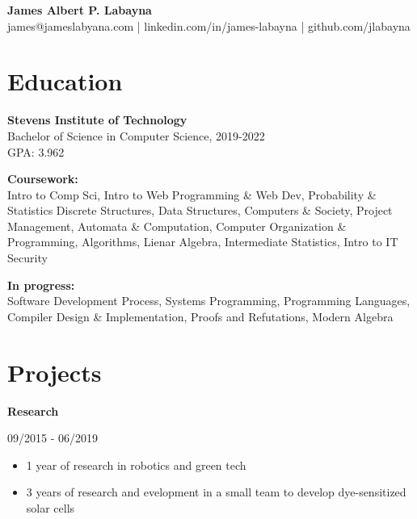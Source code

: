 \documentclass[11pt,letterpaper]{article}
\begin{document}
  \begin{center}
    \textbf{James Albert P. Labayna} \\
    \small james@jameslabyana.com | linkedin.com/in/james-labayna | github.com/jlabayna
  \end{center}
  
  \iffalse
  \begin{minipage}[t]{2in}
    \textbf{Present Address:} \\
    205 Hudson St, Apt. 602 \\
    Hoboken, NJ 07030 \\
    201.256.7526
  \end{minipage}
  \hfill
  \begin{minipage}[t]{2.4in}
    \textbf{Permanent Address:} \\
    294 S. Washington Ave., Apt. 87 \\
    Bergenfield, NJ 07030
  \end{minipage}
  \fi
  
  \section{Education}
    \textbf{Stevens Institute of Technology} \\
    Bachelor of Science in Computer Science, 2019-2022 \\
    GPA: 3.962
    
    \noindent\textbf{Coursework:}\\
    Intro to Comp Sci, Intro to Web Programming \& Web Dev, Probability \& Statistics Discrete Structures, Data Structures, Computers \& Society, Project Management, 
    Automata \& Computation, Computer Organization \& Programming, Algorithms, Lienar Algebra, Intermediate Statistics, Intro to IT Security

    \textbf{In progress:}\\
	Software Development Process, Systems Programming, Programming Languages, Compiler Design \& Implementation, Proofs and Refutations, Modern Algebra

  \section{Projects}
    \textbf{Research}\hfill
    \begin{minipage}[t]{1.2in}
      09/2015 - 06/2019
    \end{minipage}
    
      \begin{itemize}
        \item 1 year of research in robotics and green tech
        \item 3 years of research and evelopment in a small team to develop dye-sensitized solar cells
      \end{itemize}
    
\end{document}
